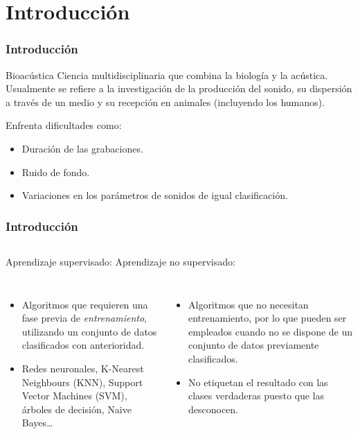 \section*{Introducción}\label{sec:introduction}

\begin{frame}
    \frametitle{Introducción}

    \begin{block}{Bioacústica}
        Ciencia multidisciplinaria que combina la biología y la acústica.
        Usualmente se refiere a la investigación de la producción del sonido, su dispersión a través de un medio y su recepción en animales (incluyendo los humanos).
    \end{block}

    \pause

    Enfrenta dificultades como:
    \begin{itemize}
        \item Duración de las grabaciones.
        \item Ruido de fondo.
        \item Variaciones en los parámetros de sonidos de igual clasificación.
    \end{itemize}
\end{frame}

\begin{frame}
    \frametitle{Introducción}

    \begin{columns}
        Aprendizaje supervisado:
        Aprendizaje no supervisado:
    \end{columns}

    \begin{columns}
        \pause

        \begin{itemize}
            \item Algoritmos que requieren una fase previa de \textit{entrenamiento}, utilizando un conjunto de datos clasificados con anterioridad.
            \item Redes neuronales, K-Nearest Neighbours (KNN), Support Vector Machines (SVM), árboles de decisión, Naive Bayes\ldots
        \end{itemize}

        \pause

        \begin{itemize}
            \item Algoritmos que no necesitan entrenamiento, por lo que pueden ser empleados cuando no se dispone de un conjunto de datos previamente clasificados.
            \item No etiquetan el resultado con las clases verdaderas puesto que las desconocen.
        \end{itemize}

    \end{columns}
\end{frame}


